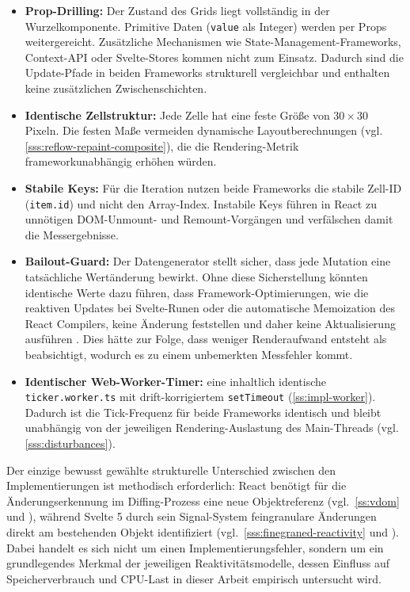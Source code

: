 \begin{itemize}
	\item \textbf{Prop-Drilling:} Der Zustand des Grids liegt vollständig in der Wurzelkomponente. Primitive Daten (\texttt{value} als Integer) werden per Props weitergereicht. Zusätzliche Mechanismen wie State-Management-Frameworks, Context-API oder Svelte-Stores kommen nicht zum Einsatz. Dadurch sind die Update-Pfade in beiden Frameworks strukturell vergleichbar und enthalten keine zusätzlichen Zwischenschichten.
	\item \textbf{Identische Zellstruktur:} Jede Zelle hat eine feste Größe von $30 \times 30$ Pixeln. Die festen Maße vermeiden dynamische Layoutberechnungen (vgl. \cref{sss:reflow-repaint-composite}), die die Rendering-Metrik frameworkunabhängig erhöhen würden.
	\item \textbf{Stabile Keys:} Für die Iteration nutzen beide Frameworks die stabile Zell-ID (\texttt{item.id}) und nicht den Array-Index. Instabile Keys führen in React zu unnötigen DOM-Unmount- und Remount-Vorgängen \cite{react-rendering-lists} und verfälschen damit die Messergebnisse.
	\item \textbf{Bailout-Guard:} Der Datengenerator stellt sicher, dass jede Mutation eine tatsächliche Wertänderung bewirkt. Ohne diese Sicherstellung könnten identische Werte dazu führen, dass Framework-Optimierungen, wie die reaktiven Updates bei Svelte-Runen oder die automatische Memoization des React Compilers, keine Änderung feststellen und daher keine Aktualisierung ausführen \cite{react_compiler_2025, svelte_runes_2023}. Dies hätte zur Folge, dass weniger Renderaufwand entsteht als beabsichtigt, wodurch es zu einem unbemerkten Messfehler kommt.
	  \item \textbf{Identischer Web-Worker-Timer:} eine inhaltlich identische
    \texttt{ticker.worker.ts} mit drift-korrigiertem \texttt{setTimeout} (\cref{ss:impl-worker}). Dadurch ist die Tick-Frequenz für beide Frameworks identisch und bleibt unabhängig von der jeweiligen Rendering-Auslastung des Main-Threads (vgl. \cref{sss:disturbances}).
\end{itemize}
Der einzige bewusst gewählte strukturelle Unterschied zwischen den Implementierungen ist methodisch erforderlich: 
React benötigt für die Änderungserkennung im Diffing-Prozess eine neue Objektreferenz (vgl.~\cref{ss:vdom} und \cite{react-memo, react_reconcillation_2024}), während Svelte 5 durch sein Signal-System feingranulare Änderungen direkt am bestehenden Objekt identifiziert (vgl.~\cref{sss:finegraned-reactivity} und \cite{svelte_runes_2023, svelte_fine-grained_reactivity-2023}).  Dabei handelt es sich nicht um einen Implementierungsfehler, sondern um ein grundlegendes Merkmal der jeweiligen Reaktivitätsmodelle, dessen Einfluss auf Speicherverbrauch und CPU-Last in dieser Arbeit empirisch untersucht wird.


